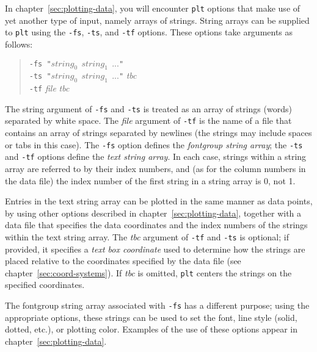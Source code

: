 \documentclass{book}
\begin{document}
%
%
%
In chapter~\ref{sec:plotting-data}, you will encounter {\tt plt} options that
make use of yet another type of input, namely arrays of strings.  String arrays
can be supplied to {\tt plt} using the {\tt -fs}, {\tt -ts}, and {\tt -tf}
options.  These options take arguments as follows:

%
%
%
\begin{quote}
{\tt -fs "}{$string_{0} \ \  string_{1} \ \  ...$}{\tt "}\\
{\tt -ts "}{$string_{0} \ \  string_{1} \ \  ...$}{\tt "} {\em tbc}\\
{\tt -tf} {\em file} {\em tbc}
\end{quote}

The string argument of {\tt -fs} and {\tt -ts} is treated as an array of
strings (words) separated by white space.  The {\em file} argument of {\tt -tf}
is the name of a file that contains an array of strings separated by newlines
(the strings may include spaces or tabs in this case).  The {\tt -fs} option
defines the {\em fontgroup string array}; the {\tt -ts} and {\tt -tf} options
define the {\em text string array}.  In each case, strings within a string
array are referred to by their index numbers, and (as for the column numbers in
the data file) the index number of the first string in a string array is 0, not
1.

%
Entries in the text string array can be plotted in the same manner as data
points, by using other options described in chapter~\ref{sec:plotting-data},
together with a data file that specifies the data coordinates and the index
numbers of the strings within the text string array.  The {\em tbc} argument of
{\tt -tf} and {\tt -ts} is optional; if provided, it specifies a {\em text box
coordinate} used to determine how the strings are placed relative to the
coordinates specified by the data file (see chapter~\ref{sec:coord-systems}).
If {\em tbc} is omitted, {\tt plt} centers the strings on the specified
coordinates.

%
%
%
The fontgroup string array associated with {\tt -fs} has a different purpose;
using the appropriate options, these strings can be used to set the font, line
style (solid, dotted, etc.), or plotting color.  Examples of the use of these
options appear in chapter~\ref{sec:plotting-data}.
\end{document}
